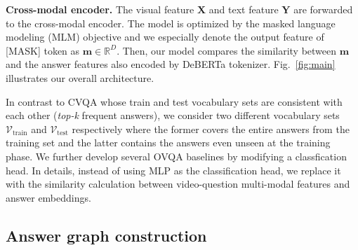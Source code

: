 \documentclass[10pt,twocolumn,letterpaper]{article}
\begin{document}
\noindent \textbf{Cross-modal encoder.}
The visual feature $\mathbf{X}$ and text feature $\mathbf{Y}$ are forwarded to the cross-modal encoder.
The model is optimized by the masked language modeling (MLM) objective and we especially denote the output feature of [MASK] token as $\mathbf{m} \in \mathbb{R}^D$.
Then, our model compares the similarity between $\mathbf{m}$ and the answer features also encoded by DeBERTa tokenizer.
Fig.~\ref{fig:main} illustrates our overall architecture.

In contrast to CVQA whose train and test vocabulary sets are consistent with each other (\textit{top-k} frequent answers), we consider two different vocabulary sets $\mathcal{V}_\text{train}$ and $\mathcal{V}_\text{test}$ respectively where the former covers the entire answers from the training set and the latter contains the answers even unseen at the training phase.
We further develop several OVQA baselines by modifying a classfication head.
In details, instead of using MLP as the classification head, we replace it with the similarity calculation between video-question multi-modal features and answer embeddings. \subsection{Answer graph construction}
\end{document}
